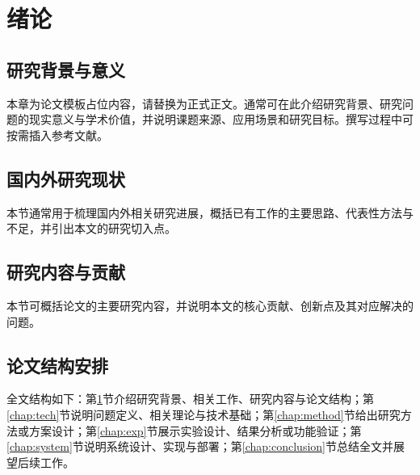 \section{绪论}\label{chap:intro}

\subsection{研究背景与意义}

本章为论文模板占位内容，请替换为正式正文。通常可在此介绍研究背景、研究问题的现实意义与学术价值，并说明课题来源、应用场景和研究目标。撰写过程中可按需插入参考文献\supercite{lamport1994latex,mittelbach2004latex}。

\subsection{国内外研究现状}

本节通常用于梳理国内外相关研究进展，概括已有工作的主要思路、代表性方法与不足，并引出本文的研究切入点。

\subsection{研究内容与贡献}

本节可概括论文的主要研究内容，并说明本文的核心贡献、创新点及其对应解决的问题。

\subsection{论文结构安排}

全文结构如下：第\ref{chap:intro}节介绍研究背景、相关工作、研究内容与论文结构；第\ref{chap:tech}节说明问题定义、相关理论与技术基础；第\ref{chap:method}节给出研究方法或方案设计；第\ref{chap:exp}节展示实验设计、结果分析或功能验证；第\ref{chap:system}节说明系统设计、实现与部署；第\ref{chap:conclusion}节总结全文并展望后续工作。
